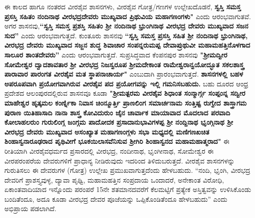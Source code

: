 ಈ ಕಾಲದ ಹಾಗೂ ನಂತರದ ವೀರಶೈವ ಶಾಸನಗಳು, ವೀರಶೈವ ಗೋತ್ರ/ಗಣಗಳ ಉಲ್ಲೇಖದೊಡನೆ, \textbf{ಸ್ವಸ್ತಿ ಸಮಸ್ತ ಪ್ರಸಸ್ತಿ ಸಹಿತಂ ನಂದಿನಾಥ ವೀರಭದ್ರದೇವರು ಮುಖ್ಯವಾದ ಪ್ರಿಥುವಿಯ ಮಹಾಗಣಂಗಳು"} ಎಂದು ಆರಂಭವಾಗುತವೆ. ಅಗರ ಶಾಸನವು,\textbf{“ಸ್ವಸ್ತಿ ಸಮಸ್ತ ಪ್ರಶಸ್ತಿ ಸಹಿತಂ ಶ‍್ರೀ ನಂದಿನಾಥ ಭ್ರುಂಗಿನಾಥ ವೀರಭದ್ರ ದೇವರು ಮುಖ್ಯವಾದ ಸಜನ ಸುದ”} ಎಂದು ಆರಂಭವಾಗುತ್ತದೆ. ಕುಂತೂರು ಶಾಸನವು \textbf{“ಸ್ವಸ್ತಿ ಸಮಸ್ತ ಪ್ರಸಸ್ತಿ ಸಹಿತ ಶ‍್ರೀ ನಂದಿನಾಥ ಭ್ರುಂಗಿನಾಥ, ವೀರಭದ್ರ ದೇವರು ಮುಖ್ಯವಾದ ಸಜ್ಜನ ಶುದ್ಧ ಶಿವಾಚಾರ ಸಂಪನ್ನರುಮಪ್ಪ ದೇವಾಪ್ರುಥುವೀ ಮಹಾಮಹತ್ತಿನೊಳಗಾದ ಸಾಲೂರ ಶಾಂತದೇವರು”} ಎಂದು ಆರಂಭವಾಗುತ್ತದೆ. ಸುಪ್ರಸಿದ್ಧವಾದ ಕೆಂಪನಪುರ ಶಾಸನವು\textbf{ "ಶ‍್ರೀಮದ್ವೀರ ಸೋಮೇಶ್ವರ ದ್ವಾದಶಾವತಾರ ಶ‍್ರೀ ವೀರಭದ್ರ ನಿಜಸ್ವರೂಪ ಶ‍್ರೀಮದೇಕಾಂತ ರಾಮೇಶ್ವರಾನ್ವಯೋದ್ಭೂತ ಸಕಲಶಾಸ್ತ್ರ ಪಾರಾವಾರ ಪಾರಂಗತ ವೀರಶೈವ ಮತ ಸ್ಥಾಪನಾಚಾರ್ಯ"} ಎಂಬುದಾಗಿ ಪ್ರಾರಂಭವಾಗುತ್ತದೆ. \textbf{ಶಾಸನಗಳಲ್ಲಿ ಬಹಳ ಅಪರೂಪವಾಗಿ ಪ್ರಯೋಗವಾಗಿರುವ ವೀರಶೈವ ಪದ ಪ್ರಯೋಗವನ್ನು ಇಲ್ಲಿ ಗಮನಿಸಬಹುದು.} ಬಹು ದೂರದ ಆಂಧ್ರ ಪ್ರದೇಶದ ಆಲಂಪುರದಲ್ಲಿರುವ ಶಾಸನವೂ ಕೂಡಾ \textbf{"ಶ‍್ರೀಮತ್ಪರಮ ವೀರಶೈವ ಶಿಧಾಂತ ಸಂನ್ಮಾರ್ಗ್ಗ ಸಂಪ್ಪಂನ್ನ ಸದ್ವೀರ ಮಾಹೇಶ್ವರ ಹೃತ್ಕಮಲ ಕಂರ್ಣ್ನಿಕಾ ನಿವಾಸ ಚಿಂನ್ಮೂರ್ತ್ತಿ ಪ್ರಾಣಲಿಂಗ ಸಮಾರ್ಚನಾಮ ಸಂತ್ತಿಷ್ಟ ರುಗ್ವೇದ ಶಾಸ್ತ್ರಾಗಮ ಪುರಾಣ ಯಿತಿಹಾಸಾದಿ ನಾನಾ ಶಾಸ್ತ್ರ ಕೋವಿದುರುಂ ಜೈನ ಚಾರ್ವಾಕ ಮಾಯಾವಾದ ಮೊದಲಾದ ಪರವಾದಿ ಕೋಲಾಹಲರುಂ ಗುರುಲಿಂಗ್ಗ ಜಂಗ್ಗಮ ಪಾದೋದಕ ಪ್ರಸಾದಾನುಭಾವಿಗಳಪ್ಪ ಶ‍್ರೀ ನಂದ್ದಿನಾಥ ಭೃಂಗ್ಗಿನಾಥ ಶ‍್ರೀ ವೀರಭದ್ರ ದೇವರು ಮುಖ್ಯವಾದ ಅಸಂಖ್ಯಾತ ಮಹಾಗಣಂಗ್ಗಳು ಸಭಾ ಮಧ್ಯದಲ್ಲಿ ಮಣಿಗಣಖಚಿತ ಶಿಂಹಾಸ್ವನಾರೂಢರಾದ ಪೃಥಿವೀಗೆ ಭೂಕಯಿಲಾಸವೆನಿಸುವ ಶ‍್ರೀಗಿರಿ ಶಿಂಹಾಸ್ವನದ ಮಹಾಮಹಾತ್ಮರಾದ"} ಈ ರೀತಿಯಾಗಿ ವೀರಶೈವಧರ್ಮದ ಪ್ರಸಾರದಲ್ಲಿ ವೀರಭದ್ರ, ನಂದೀನಾಥ, ಭೃಂಗೀನಾಥ, ಸೋಮೇಶ್ವರ ಈ ವೀರಪರಂಪರೆಯ ದೇವರುಗಳಿಗೆ ಪ್ರಾಧಾನ್ಯ ನೀಡಿರುವುದು ಇದರಿಂದ ತಿಳಿದುಬರುತ್ತದೆ. ವೀರಶೈವ ಶಾಸನಗಳನ್ನು ಗುರುತಿಸಲು ಈ ದೇವರುಗಳ (ಗೋತ್ರ) ಉಲ್ಲೇಖ ಪ್ರಮುಖವಾಗುತ್ತದೆಂದು ಹೇಳಬಹುದು. “ನಂದಿ, ಭೃಂಗಿ, ವೀರಭದ್ರ ದೇವರಿಗೆ ಪ್ರಾಶಸ್ತ್ಯವುಳ್ಳ, ದ್ಯಾವಾ ಪೃಥ್ವಿ, ಮಹಾಮಹತ್ತಿನ ಸಂಪ್ರದಾಯ ಒಂದಾದರೆ, ಅನೇಕಾಂತ ವಿರೋಧಿ, ಏಕಾಂತವಾದಿಯಾದ ಇನ್ನೊಂದು ಪರಂಪರೆ 15ನೇ ಶತಮಾನದವರೆಗೆ ಕೆಲಮಟ್ಟಿಗೆ ಪ್ರತ್ಯೇಕ ಅಸ್ತಿತ್ವವನ್ನು ಉಳಿಸಿಕೊಂಡು ಬಂದಿತೆಂದೂ, ಅದೂ ಕೂಡಾ ವೀರಭದ್ರ ದೇವರ ಪೂಜೆಯನ್ನು ಒಪ್ಪಿಕೊಂಡಿತೆಂದೂ ಹೇಳಬಹುದು” ಎಂದು ಅಭಿಪ್ರಾಯ ಪಡಲಾಗಿದೆ.


